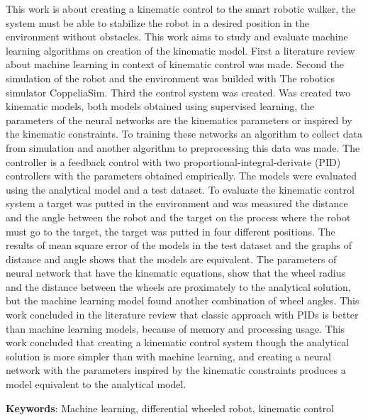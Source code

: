 This work is about creating a kinematic control to the smart robotic walker,
the system must be able to stabilize the robot in a desired position
in the environment without obstacles. This work aims to study and evaluate
machine learning algorithms
on creation of the kinematic model. First a literature review about
machine learning in context of kinematic control was made. Second the
simulation of the robot and the environment was builded with The robotics
simulator CoppeliaSim. Third the control system was created.
Was created two kinematic models, both models obtained using supervised learning,
the parameters of the neural networks are the kinematics parameters or
inspired by the kinematic constraints. To training these networks
an algorithm to collect data from simulation
 and another algorithm to preprocessing this data was made. The controller
is a feedback control with two proportional-integral-derivate (PID) controllers
with the parameters obtained empirically. The models were evaluated using the
analytical model and a test dataset. To evaluate the kinematic control system
a target was putted in the environment and was measured the distance and the
angle between the robot and the target on the process where the robot must
go to the target, the target was putted in four different positions.
The results of mean square error of the models in the test dataset and
the graphs of distance and angle shows that the models are equivalent.
The parameters of neural network
that have the kinematic equations, show that the wheel radius and the
distance between the wheels are proximately to the analytical solution, but
the machine learning model found another combination of wheel angles.
This work concluded in the literature review that classic approach
with PIDs is better than machine learning models, because of memory
and processing usage. This work concluded that creating a kinematic
control system though the analytical solution is more simpler than
with machine learning, and creating a neural network with the parameters
inspired by the kinematic constraints produces a model equivalent to
the analytical model.



\vspace{1.5ex}

{\bf Keywords}: Machine learning, differential wheeled robot, kinematic control
